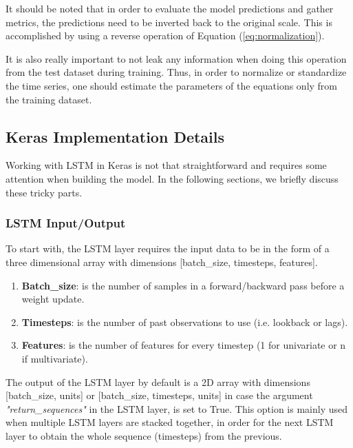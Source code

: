 \documentclass[a4paper, 12pt]{article}
\numberwithin{equation}{section}
\numberwithin{figure}{section}
\numberwithin{table}{section}
\begin{document}
	It should be noted that in order to evaluate the model predictions and gather metrics, the predictions need to be inverted back to the original scale. This is accomplished by using a reverse operation of Equation (\ref{eq:normalization}). \par
	
	It is also really important to not leak any information when doing this operation from the test dataset during training. Thus, in order to normalize or standardize the time series, one should estimate the parameters of the equations only from the training dataset.
	
	\newpage
	
	\subsection{Keras Implementation Details}
	
	Working with LSTM in Keras is not that straightforward and requires some attention when building the model. In the following sections, we briefly discuss these tricky parts.
	
	\subsubsection{LSTM Input/Output}

	To start with, the LSTM layer requires the input data to be in the form of a three dimensional array with dimensions [batch\_size, timesteps, features].
	\begin{enumerate}
		\item { \textbf{Batch\_size}}: is the number of samples in a forward/backward pass before a weight update.
		
		\item { \textbf{Timesteps}}: is the number of past observations to use (i.e. lookback or lags).
		
		\item {\textbf{Features}}: is the number of features for every timestep (1 for univariate or n if multivariate).
	\end{enumerate}
	
	The output of the LSTM layer by default is a 2D array with dimensions [batch\_size, units] or [batch\_size, timesteps, units] in case the argument \textit{"return\_sequences"} in the LSTM layer, is set to True. This option is mainly used when multiple LSTM layers are stacked together, in order for the next LSTM layer to obtain the whole sequence (timesteps) from the previous.
	
\end{document}
